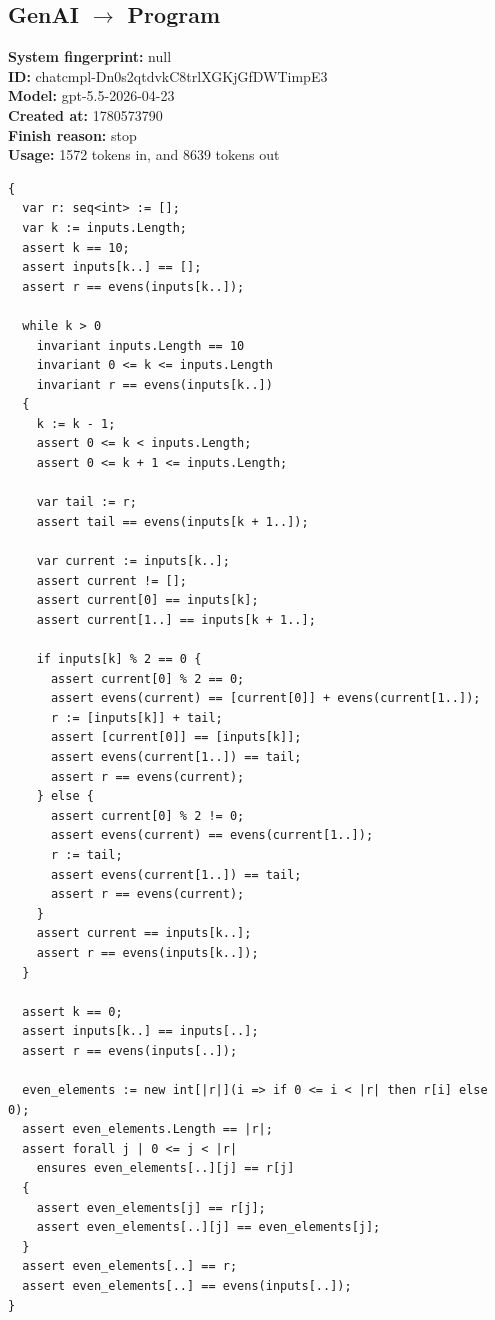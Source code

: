 \documentclass{article}
\begin{document}
\subsection*{GenAI $\rightarrow$ Program}
\textbf{System fingerprint: }null
\\\textbf{ID: }chatcmpl-Dn0s2qtdvkC8trlXGKjGfDWTimpE3
\\\textbf{Model: }gpt-5.5-2026-04-23
\\\textbf{Created at: }1780573790
\\\textbf{Finish reason: }stop
\\\textbf{Usage: }1572 tokens in, and 8639 tokens out
\begin{lstlisting}
{
  var r: seq<int> := [];
  var k := inputs.Length;
  assert k == 10;
  assert inputs[k..] == [];
  assert r == evens(inputs[k..]);

  while k > 0
    invariant inputs.Length == 10
    invariant 0 <= k <= inputs.Length
    invariant r == evens(inputs[k..])
  {
    k := k - 1;
    assert 0 <= k < inputs.Length;
    assert 0 <= k + 1 <= inputs.Length;

    var tail := r;
    assert tail == evens(inputs[k + 1..]);

    var current := inputs[k..];
    assert current != [];
    assert current[0] == inputs[k];
    assert current[1..] == inputs[k + 1..];

    if inputs[k] % 2 == 0 {
      assert current[0] % 2 == 0;
      assert evens(current) == [current[0]] + evens(current[1..]);
      r := [inputs[k]] + tail;
      assert [current[0]] == [inputs[k]];
      assert evens(current[1..]) == tail;
      assert r == evens(current);
    } else {
      assert current[0] % 2 != 0;
      assert evens(current) == evens(current[1..]);
      r := tail;
      assert evens(current[1..]) == tail;
      assert r == evens(current);
    }
    assert current == inputs[k..];
    assert r == evens(inputs[k..]);
  }

  assert k == 0;
  assert inputs[k..] == inputs[..];
  assert r == evens(inputs[..]);

  even_elements := new int[|r|](i => if 0 <= i < |r| then r[i] else 0);
  assert even_elements.Length == |r|;
  assert forall j | 0 <= j < |r|
    ensures even_elements[..][j] == r[j]
  {
    assert even_elements[j] == r[j];
    assert even_elements[..][j] == even_elements[j];
  }
  assert even_elements[..] == r;
  assert even_elements[..] == evens(inputs[..]);
}
\end{lstlisting}
\end{document}
